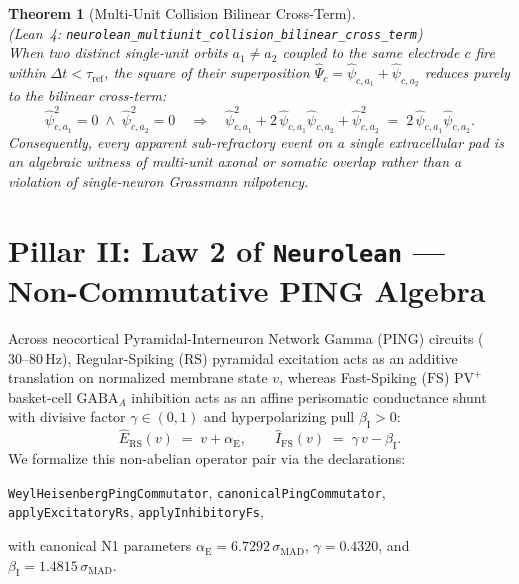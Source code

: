 \documentclass[11pt,letterpaper]{article}
\newcommand{\lean}[1]{\nolinkurl{#1}}
\newtheorem{theorem}{Theorem}[section]
\theoremstyle{definition}
\begin{document}
\begin{theorem}[Multi-Unit Collision Bilinear Cross-Term]
\label{thm:t3}
~\\
(\emph{Lean~4:} \lean{neurolean_multiunit_collision_bilinear_cross_term})\\
When two distinct single-unit orbits $a_1 \neq a_2$ coupled to the same electrode $c$ fire within $\Delta t < \tau_{\mathrm{ref}}$, the square of their superposition $\hat{\Psi}_c = \hat{\psi}_{c,a_1} + \hat{\psi}_{c,a_2}$ reduces purely to the bilinear cross-term:
\begin{equation}
\label{eq:t3_bilinear}
\hat{\psi}_{c,a_1}^2 = 0 \;\wedge\; \hat{\psi}_{c,a_2}^2 = 0
\quad\Longrightarrow\quad
\hat{\psi}_{c,a_1}^2 + 2\,\hat{\psi}_{c,a_1}\hat{\psi}_{c,a_2} + \hat{\psi}_{c,a_2}^2
\;=\; 2\,\hat{\psi}_{c,a_1}\hat{\psi}_{c,a_2}.
\end{equation}
Consequently, every apparent sub-refractory event on a single extracellular pad is an algebraic witness of multi-unit axonal or somatic overlap rather than a violation of single-neuron Grassmann nilpotency.
\end{theorem}

\section[Pillar II: Law 2 of Neurolean --- Non-Commutative PING Algebra]{Pillar II: Law 2 of \texttt{Neurolean} --- Non-Commutative PING Algebra}

Across neocortical Pyramidal-Interneuron Network Gamma (PING) circuits ($30\text{--}80\,\text{Hz}$), Regular-\allowbreak Spiking ($\mathrm{RS}$) pyramidal excitation acts as an additive translation on normalized membrane state $v$, whereas Fast-\allowbreak Spiking ($\mathrm{FS}$) $\mathrm{PV}^+$ basket-cell $\mathrm{GABA}_A$ inhibition acts as an affine perisomatic conductance shunt with divisive factor $\gamma \in (0,1)$ and hyperpolarizing pull $\beta_{\mathrm{I}} > 0$:
\begin{equation}
\label{eq:ei_operators}
\hat{E}_{\mathrm{RS}}(v) \;=\; v + \alpha_{\mathrm{E}},
\qquad
\hat{I}_{\mathrm{FS}}(v) \;=\; \gamma\,v - \beta_{\mathrm{I}}.
\end{equation}
We formalize this non-abelian operator pair via the declarations:
\begin{center}
\footnotesize
\lean{WeylHeisenbergPingCommutator}, \quad \lean{canonicalPingCommutator}, \quad \lean{applyExcitatoryRs}, \quad \lean{applyInhibitoryFs},
\end{center}
with canonical N1 parameters $\alpha_{\mathrm{E}} = 6.7292\,\sigma_{\mathrm{MAD}}$, $\gamma = 0.4320$, and $\beta_{\mathrm{I}} = 1.4815\,\sigma_{\mathrm{MAD}}$.
\end{document}
